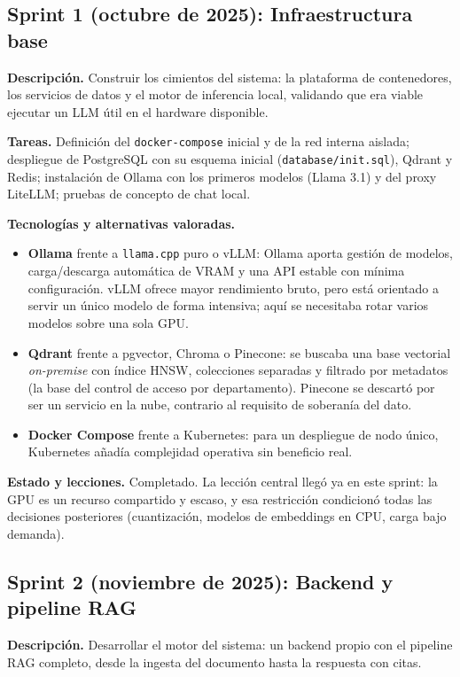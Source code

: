 \subsection{Sprint 1 (octubre de 2025): Infraestructura base}

\textbf{Descripción.} Construir los cimientos del sistema: la plataforma de contenedores, los servicios de datos y el motor de inferencia local, validando que era viable ejecutar un LLM útil en el hardware disponible.

\textbf{Tareas.} Definición del \texttt{docker-compose} inicial y de la red interna aislada; despliegue de PostgreSQL con su esquema inicial (\texttt{database/init.sql}), Qdrant y Redis; instalación de Ollama con los primeros modelos (Llama 3.1) y del proxy LiteLLM; pruebas de concepto de chat local.

\textbf{Tecnologías y alternativas valoradas.}
\begin{itemize}
    \item \textbf{Ollama} frente a \texttt{llama.cpp} puro o vLLM: Ollama aporta gestión de modelos, carga/descarga automática de VRAM y una API estable con mínima configuración. vLLM ofrece mayor rendimiento bruto, pero está orientado a servir un único modelo de forma intensiva; aquí se necesitaba rotar varios modelos sobre una sola GPU.
    \item \textbf{Qdrant} frente a pgvector, Chroma o Pinecone: se buscaba una base vectorial \textit{on-premise} con índice HNSW, colecciones separadas y filtrado por metadatos (la base del control de acceso por departamento). Pinecone se descartó por ser un servicio en la nube, contrario al requisito de soberanía del dato.
    \item \textbf{Docker Compose} frente a Kubernetes: para un despliegue de nodo único, Kubernetes añadía complejidad operativa sin beneficio real.
\end{itemize}

\textbf{Estado y lecciones.} Completado. La lección central llegó ya en este sprint: la GPU es un recurso compartido y escaso, y esa restricción condicionó todas las decisiones posteriores (cuantización, modelos de embeddings en CPU, carga bajo demanda).

\subsection{Sprint 2 (noviembre de 2025): Backend y pipeline RAG}

\textbf{Descripción.} Desarrollar el motor del sistema: un backend propio con el pipeline RAG completo, desde la ingesta del documento hasta la respuesta con citas.


